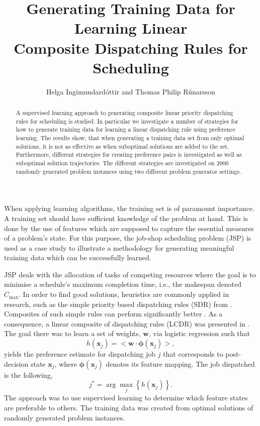\documentclass[smallextended]{llncs}
\newcommand{\vphi}{{\boldsymbol{\phi}}}
\renewcommand{\vec}[1]{\mathbf{#1}}
\newcommand{\shortcite}[1]{\cite{#1}}
\begin{document}
\title{Generating Training Data for Learning Linear \\ Composite Dispatching Rules for Scheduling}
\author{Helga Ingimundard\'ottir and Thomas Philip R\'unarsson}

\maketitle
\begin{abstract}
A supervised learning approach to generating composite linear priority dispatching rules for scheduling is studied. In particular we investigate a number of strategies for how to generate training data for learning a linear dispatching rule using preference learning. 
The results show, that when generating a training data set from only optimal solutions, it is not as effective as when suboptimal solutions are added to the set. 
Furthermore, different strategies for creating preference pairs is investigated as well as suboptimal solution trajectories. The different strategies are investigated on 2000 randomly generated problem instances using two different problem generator settings.
\end{abstract}

\noindent When applying learning algorithms, the training set is of paramount importance. A training set should have sufficient knowledge of the problem at hand. 
This is done by the use of features which are supposed to capture the essential measures of a problem's state. For this purpose, the job-shop scheduling problem (JSP) is used as a case study to illustrate a methodology for generating meaningful training data which can be successfully learned. 

JSP deals with the allocation of tasks of competing resources where the goal is to minimise a schedule's maximum completion time, i.e., the makespan denoted $C_{\max}$. In order to find good solutions, heuristics are commonly applied in research, such as the simple priority based dispatching rules (SDR) from \cite{Panwalkar77}. Composites of such simple rules can perform significantly better \cite{Jayamohan04}. 
As a consequence, a linear composite of dispatching rules (LCDR) was presented  in \shortcite{InRu11a}. The goal there was to learn a set of weights, $\vec{w}$, via logistic regression such that 
\begin{equation}\label{eq:jssp:linweights}
h(\vec{x}_j)=\big<{\vec{w}}\cdot{\vphi(\vec{x}_j)}\big>,
\end{equation}
yields the preference estimate for dispatching job $j$ that corresponds to post-decision state $\vec{x}_j$, where $\vphi(\vec{x}_j)$ denotes its feature mapping. The job dispatched is the following, 
\begin{equation}\label{eq:jstar}
j^* = \arg\max_j\left\{h(\vec{x}_j)\right\}. 
\end{equation}
The approach was to use supervised learning to determine which feature states are preferable to others. 
The training data was created from optimal solutions of randomly generated problem instances. 
\end{document}
